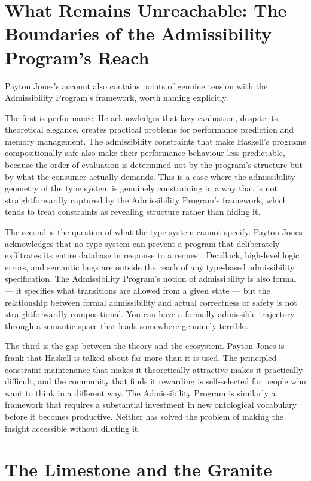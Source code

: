 \documentclass[12pt]{article}
\begin{document}
\section{What Remains Unreachable: The Boundaries of the Admissibility Program's Reach}

Payton Jones's account also contains points of genuine tension with the
Admissibility Program's framework, worth naming explicitly.

The first is performance. He acknowledges that lazy evaluation, despite its
theoretical elegance, creates practical problems for performance prediction and
memory management. The admissibility constraints that make Haskell's programs
compositionally safe also make their performance behaviour less predictable,
because the order of evaluation is determined not by the program's structure but
by what the consumer actually demands. This is a case where the admissibility
geometry of the type system is genuinely constraining in a way that is not
straightforwardly captured by the Admissibility Program's framework, which
tends to treat constraints as revealing structure rather than hiding it.

The second is the question of what the type system cannot specify. Payton Jones
acknowledges that no type system can prevent a program that deliberately
exfiltrates its entire database in response to a request. Deadlock, high-level
logic errors, and semantic bugs are outside the reach of any type-based
admissibility specification. The Admissibility Program's notion of admissibility
is also formal — it specifies what transitions are allowed from a given state —
but the relationship between formal admissibility and actual correctness or
safety is not straightforwardly compositional. You can have a formally admissible
trajectory through a semantic space that leads somewhere genuinely terrible.

The third is the gap between the theory and the ecosystem. Payton Jones is frank
that Haskell is talked about far more than it is used. The principled constraint
maintenance that makes it theoretically attractive makes it practically
difficult, and the community that finds it rewarding is self-selected for
people who want to think in a different way. The Admissibility Program is
similarly a framework that requires a substantial investment in new ontological
vocabulary before it becomes productive. Neither has solved the problem of making
the insight accessible without diluting it.

\section{The Limestone and the Granite}
\end{document}
